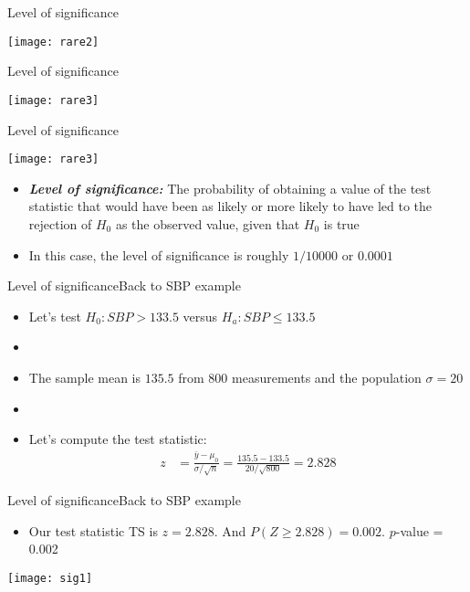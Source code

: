 \documentclass[xcolor=dvipsnames]{beamer}
\begin{document}
\begin{frame}{Level of significance}
\begin{center}
	\texttt{[image: rare2]}
\end{center}
\end{frame}

\begin{frame}{Level of significance}
\begin{center}
	\texttt{[image: rare3]}
\end{center}
\end{frame}

\begin{frame}{Level of significance}
\begin{center}
	\texttt{[image: rare3]}
\end{center}
\vspace{-10pt}
\begin{itemize}
	\item \textbf{\emph{Level of significance:}} The probability of obtaining a value of the test statistic that would have been as likely or more likely to have led to the rejection of $H_0$ as the observed value, given that $H_0$ is true
	\item In this case, the level of significance is roughly $1/10000$ or $0.0001$
\end{itemize}
\end{frame}

\begin{frame}{Level of significance}{Back to SBP example}
\begin{itemize}
	\item Let's test $H_0: SBP > 133.5$ versus $H_a: SBP \leq 133.5$ 
	\item[]
	\item The sample mean is $135.5$ from 800 measurements and the population $\sigma = 20$
	\item[]
	\item Let's compute the test statistic:
	\begin{align*}
	z &= \frac{\bar{y} - \mu_0}{\sigma / \sqrt{n}} = \frac{135.5 - 133.5}{20 / \sqrt{800}} = 2.828
	\end{align*}
\end{itemize}
\end{frame}

\begin{frame}{Level of significance}{Back to SBP example}
\begin{itemize}
	\item Our test statistic TS is $z = 2.828$. And $P(Z \geq 2.828) = 0.002$. $p$-value = 0.002
\end{itemize}
\vspace{-10pt}
\begin{center}
	\texttt{[image: sig1]}
\end{center}
\end{frame}
\end{document}
